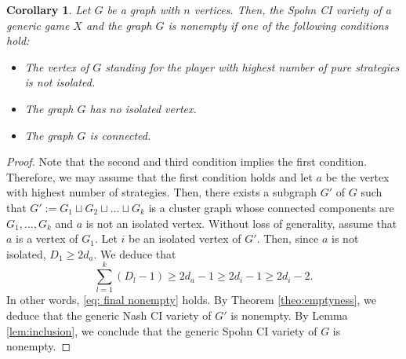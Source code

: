 \documentclass[11pt]{amsart}
\numberwithin{equation}{section}
\theoremstyle{plain}
\numberwithin{theorem}{section}
\newtheorem{corollary}[theorem]{Corollary}
\theoremstyle{definition}
\begin{document}
\begin{corollary}\label{cor:emptiness}
Let $G$ be a graph with $n$ vertices. Then, the Spohn CI variety of a generic game $X$ and the graph $G$ is nonempty if one of the following conditions hold:
\begin{itemize}
    \item The vertex of $G$ standing for the player with highest number of pure strategies is not isolated.
    \item The graph $G$ has no isolated vertex.
    \item The graph $G$ is connected.
\end{itemize}
\end{corollary}
\begin{proof}
    Note that  the second and third condition implies the first condition. Therefore, we may assume that the first condition holds and let $a$ be the vertex with highest number of strategies. Then, there exists a subgraph $G'$ of $G$ such that $G':=G_1\sqcup G_2\sqcup\ldots\sqcup G_k$ is a cluster graph whose connected components are $G_1,\ldots,G_k$ and $a$ is not an isolated vertex. Without loss of generality, assume that $a$ is a vertex of $G_1$. Let $i$ be an isolated vertex of $G'$. Then, since $a$ is not isolated, $D_1\geq 2d_a$. We deduce that  
    \[
    \sum_{l=1}^k(D_l-1) \geq 2d_a-1\geq 2d_i-1\geq 2d_i-2.
    \]
    In other words, \eqref{eq: final nonempty} holds. By Theorem \ref{theo:emptyness}, we deduce that the generic Nash CI variety of $G'$ is nonempty. By Lemma \ref{lem:inclusion}, we conclude that the generic Spohn CI variety of $G$ is nonempty.
\end{proof}
\end{document}
